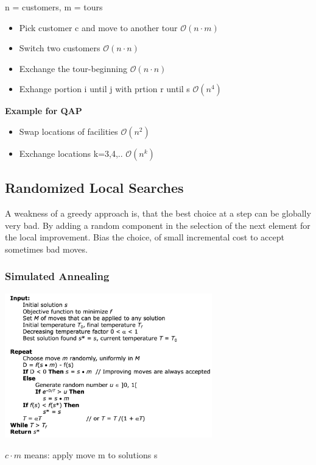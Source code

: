 \documentclass[10pt,a4paper,twocolumn]{article}
\begin{document}
n = customers, m = tours
\begin{itemize}
	\item Pick customer c and move to another tour $\mathcal{O}(n \cdot m)$
	\item Switch two customers $\mathcal{O}(n \cdot n)$
	\item Exchange the tour-beginning $\mathcal{O}(n \cdot n)$
	\item Exhange portion i until j with prtion r until s $\mathcal{O}(n^4)$
\end{itemize}

\textbf{Example for QAP}
\begin{itemize}
	\item Swap locations of facilities $\mathcal{O}(n^2)$
	\item Exchange locations k=3,4,.. $\mathcal{O}(n^k)$
\end{itemize}

\subsection{Randomized Local Searches}
A weakness of a greedy approach is, that the best choice at a step can be globally very bad. By adding a random component in the selection of the next element for the local improvement. Bias the choice, of small incremental cost to accept sometimes bad moves.

\subsubsection{Simulated Annealing}
\begin{center}
\includegraphics[width=9cm]{images/simulated-annealing}
\end{center}

$c \cdot m$ means: apply move m to solutions s\\
\end{document}
